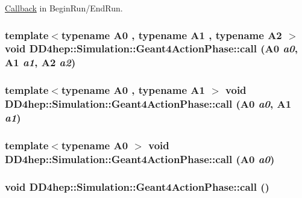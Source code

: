 \hyperlink{class_d_d4hep_1_1_callback}{Callback} in BeginRun/EndRun. \hypertarget{class_d_d4hep_1_1_simulation_1_1_geant4_action_phase_a7446c7f582c82adbb22d967ce1fefe87}{
\subsubsection[{call}]{\setlength{\rightskip}{0pt plus 5cm}template$<$typename A0 , typename A1 , typename A2 $>$ void DD4hep::Simulation::Geant4ActionPhase::call (A0 {\em a0}, \/  A1 {\em a1}, \/  A2 {\em a2})}}
\label{class_d_d4hep_1_1_simulation_1_1_geant4_action_phase_a7446c7f582c82adbb22d967ce1fefe87}
\hypertarget{class_d_d4hep_1_1_simulation_1_1_geant4_action_phase_a225034a1d517ce143896aa3e37ed1d0d}{
\subsubsection[{call}]{\setlength{\rightskip}{0pt plus 5cm}template$<$typename A0 , typename A1 $>$ void DD4hep::Simulation::Geant4ActionPhase::call (A0 {\em a0}, \/  A1 {\em a1})}}
\label{class_d_d4hep_1_1_simulation_1_1_geant4_action_phase_a225034a1d517ce143896aa3e37ed1d0d}
\hypertarget{class_d_d4hep_1_1_simulation_1_1_geant4_action_phase_adcdd1c93f7e68e1172726ab95ab8f86f}{
\subsubsection[{call}]{\setlength{\rightskip}{0pt plus 5cm}template$<$typename A0 $>$ void DD4hep::Simulation::Geant4ActionPhase::call (A0 {\em a0})}}
\label{class_d_d4hep_1_1_simulation_1_1_geant4_action_phase_adcdd1c93f7e68e1172726ab95ab8f86f}
\hypertarget{class_d_d4hep_1_1_simulation_1_1_geant4_action_phase_ae0022a7ef73336336dc256644bd06a12}{
\subsubsection[{call}]{\setlength{\rightskip}{0pt plus 5cm}void DD4hep::Simulation::Geant4ActionPhase::call ()}}
\label{class_d_d4hep_1_1_simulation_1_1_geant4_action_phase_ae0022a7ef73336336dc256644bd06a12}


